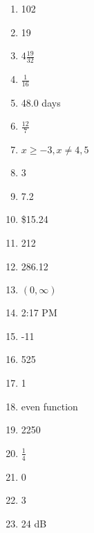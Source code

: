 \documentclass[../uilmath.tex]{subfiles}
\begin{document}
\begin{enumerate}[label=\bfseries\arabic*.]
    \item %
    102 

    \item %
    19

    \item %
    $4\frac{19}{32}$

    \item %
    $\frac{1}{16}$

    \item %
    48.0 days 

    \item %
    $\frac{12}{7}$

    \item %
    $x\geq -3, x\neq 4,5$

    \item %
    3

    \item %
    7.2 

    \item %
    \$15.24

    \item %
    212

    \item %
    286.12

    \item %
    $(0,\infty)$

    \item %
    2:17 PM 

    \item %
    -11

    \item %
    525

    \item %
    1

    \item %
    even function 

    \item %
    2250

    \item %
    $\frac{1}{4}$

    \item %
    0

    \item %
    3

    \item %
    24 dB 


\end{enumerate}
\end{document}
